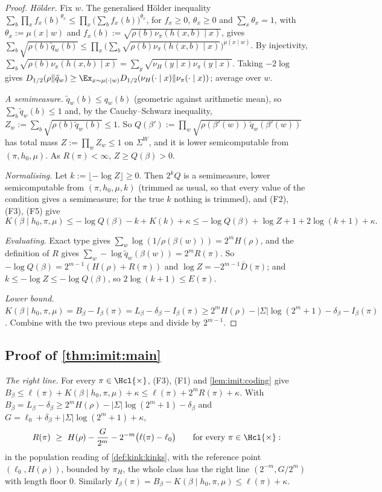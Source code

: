 \begin{proof}
\emph{Hölder.} Fix $w$. The generalised Hölder inequality $\sum_b\prod_xf_x(b)^{\theta_x}\le\prod_x\big(\sum_bf_x(b)\big)^{\theta_x}$, for $f_x\ge0$, $\theta_x\ge0$ and $\sum_x\theta_x=1$, with $\theta_x:=\mu(x\mid w)$ and $f_x(b):=\sqrt{\rho(b)\nu_\pi(h(x,b)\mid x)}$, gives $\sum_b\sqrt{\rho(b)\tilde q_w(b)}\le\prod_x\big(\sum_b\sqrt{\rho(b)\nu_\pi(h(x,b)\mid x)}\big)^{\mu(x\mid w)}$. By injectivity, $\sum_b\sqrt{\rho(b)\nu_\pi(h(x,b)\mid x)}=\sum_y\sqrt{\nu_H(y\mid x)\nu_\pi(y\mid x)}$. Taking $-2\log$ gives $D_{1/2}(\rho\Vert\tilde q_w)\ge\Ex_{x\sim\mu(\cdot\mid w)}D_{1/2}(\nu_H(\cdot\mid x)\Vert\nu_\pi(\cdot\mid x))$; average over $w$.

\emph{A semimeasure.} $\tilde q_w(b)\le q_w(b)$ (geometric against arithmetic mean), so $\sum_b\tilde q_w(b)\le1$ and, by the Cauchy--Schwarz inequality, $Z_w:=\sum_b\sqrt{\rho(b)\tilde q_w(b)}\le1$. So $Q(\beta'):=\prod_w\sqrt{\rho(\beta'(w))\,\tilde q_w(\beta'(w))}$ has total mass $Z:=\prod_wZ_w\le1$ on $\Sigma^W$, and it is lower semicomputable from $(\pi,h_0,\mu)$. As $R(\pi)<\infty$, $Z\ge Q(\beta)>0$.

\emph{Normalising.} Let $k:=\lfloor-\log Z\rfloor\ge0$. Then $2^kQ$ is a semimeasure, lower semicomputable from $(\pi,h_0,\mu,k)$ (trimmed as usual, so that every value of the condition gives a semimeasure; for the true $k$ nothing is trimmed), and (F2), (F3), (F5) give
\[
K(\beta\mid h_0,\pi,\mu)\le-\log Q(\beta)-k+K(k)+\kappa\le-\log Q(\beta)+\log Z+1+2\log(k+1)+\kappa .
\]

\emph{Evaluating.} Exact type gives $\sum_w\log(1/\rho(\beta(w)))=2^mH(\rho)$, and the definition of $R$ gives $\sum_w-\log\tilde q_w(\beta(w))=2^mR(\pi)$. So $-\log Q(\beta)=2^{m-1}(H(\rho)+R(\pi))$ and $\log Z=-2^{m-1}\bar D(\pi)$; and $k\le-\log Z\le-\log Q(\beta)$, so $2\log(k+1)\le E(\pi)$.

\emph{Lower bound.} $K(\beta\mid h_0,\pi,\mu)=B_\beta-I_\beta(\pi)=L_\beta-\delta_\beta-I_\beta(\pi)\ge2^mH(\rho)-|\Sigma|\log(2^m+1)-\delta_\beta-I_\beta(\pi)$. Combine with the two previous steps and divide by $2^{m-1}$.
\end{proof}

\subsection{Proof of \texorpdfstring{\cref{thm:imit:main}}{the near-imitation theorem}}\label{app:imit:main}

\emph{The right line.} For every $\pi\in\Hcl{\times}$, (F3), (F1) and \cref{lem:imit:coding} give $B_\beta\le\ell(\pi)+K(\beta\mid h_0,\pi,\mu)+\kappa\le\ell(\pi)+2^mR(\pi)+\kappa$. With $B_\beta=L_\beta-\delta_\beta\ge2^mH(\rho)-|\Sigma|\log(2^m+1)-\delta_\beta$ and $G=\ell_0+\delta_\beta+|\Sigma|\log(2^m+1)+\kappa$,
\[
R(\pi)\ \ge\ H(\rho)-\frac G{2^m}-2^{-m}\big(\ell(\pi)-\ell_0\big)\qquad\text{for every }\pi\in\Hcl{\times}:
\]
in the population reading of \cref{def:kink:kinks}, with the reference point $(\ell_0,H(\rho))$, bounded by $\pi_H$, the whole class has the right line $(2^{-m},G/2^m)$ with length floor $0$. Similarly $I_\beta(\pi)=B_\beta-K(\beta\mid h_0,\pi,\mu)\le\ell(\pi)+\kappa$.

